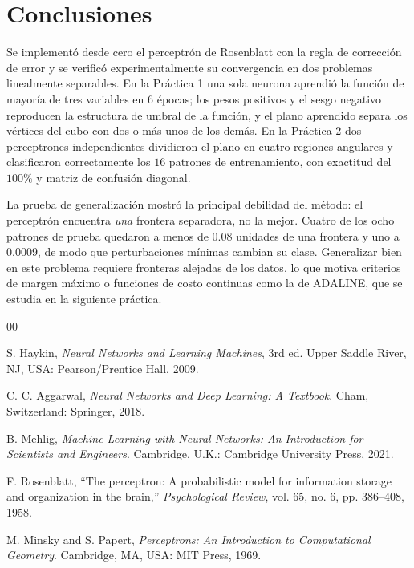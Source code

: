\documentclass[conference]{IEEEtran}
\begin{document}
\section{Conclusiones}
Se implementó desde cero el perceptrón de Rosenblatt con la regla de
corrección de error y se verificó experimentalmente su convergencia en dos
problemas linealmente separables. En la Práctica 1 una sola neurona aprendió
la función de mayoría de tres variables en $6$ épocas; los pesos positivos y
el sesgo negativo reproducen la estructura de umbral de la función, y el
plano aprendido separa los vértices del cubo con dos o más unos de los demás.
En la Práctica 2 dos perceptrones independientes dividieron el plano en
cuatro regiones angulares y clasificaron correctamente los $16$ patrones de
entrenamiento, con exactitud del $100\%$ y matriz de confusión diagonal.

La prueba de generalización mostró la principal debilidad del método: el
perceptrón encuentra \emph{una} frontera separadora, no la mejor. Cuatro de
los ocho patrones de prueba quedaron a menos de $0.08$ unidades de una
frontera y uno a $0.0009$, de modo que perturbaciones mínimas cambian su
clase. Generalizar bien en este problema requiere fronteras alejadas de los
datos, lo que motiva criterios de margen máximo o funciones de costo
continuas como la de ADALINE, que se estudia en la siguiente práctica.

\begin{thebibliography}{00}

 S. Haykin, \textit{Neural Networks and Learning Machines}, 3rd ed. Upper Saddle River, NJ, USA: Pearson/Prentice Hall, 2009.

 C. C. Aggarwal, \textit{Neural Networks and Deep Learning: A Textbook}. Cham, Switzerland: Springer, 2018.

 B. Mehlig, \textit{Machine Learning with Neural Networks: An Introduction for Scientists and Engineers}. Cambridge, U.K.: Cambridge University Press, 2021.

 F. Rosenblatt, ``The perceptron: A probabilistic model for information storage and organization in the brain,'' \textit{Psychological Review}, vol. 65, no. 6, pp. 386--408, 1958.

 M. Minsky and S. Papert, \textit{Perceptrons: An Introduction to Computational Geometry}. Cambridge, MA, USA: MIT Press, 1969.

\end{thebibliography}
\end{document}
